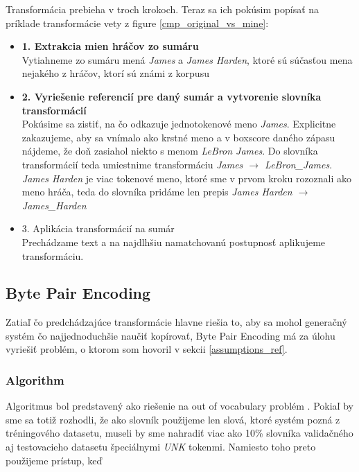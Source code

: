 Transformácia prebieha v troch krokoch. Teraz sa ich pokúsim popísať na príklade transformácie vety z figure \ref{cmp_original_vs_mine}:
\begin{itemize}
    \item \textbf{1. Extrakcia mien hráčov zo sumáru} \hfill \\
    Vytiahneme zo sumáru mená \emph{James} a \emph{James Harden}, ktoré sú súčasťou mena nejakého z hráčov, ktorí sú známi z korpusu
    \item \textbf{2. Vyriešenie referencií pre daný sumár a vytvorenie slovníka transformácií} \hfill \\
    Pokúsime sa zistiť, na čo odkazuje jednotokenové meno \emph{James}. Explicitne zakazujeme, aby sa vnímalo ako krstné meno a v boxscore daného zápasu nájdeme, že doň zasiahol niekto s menom \emph{LeBron James}. Do slovníka transformácií teda umiestnime transformáciu \emph{James $\rightarrow$ LeBron\_James}. \emph{James Harden} je viac tokenové meno, ktoré sme v prvom kroku rozoznali ako meno hráča, teda do slovníka pridáme len prepis \emph{James Harden $\rightarrow$ James\_Harden}
    \item 3. Aplikácia transformácií na sumár \hfill \\
    Prechádzame text a na najdlhšiu namatchovanú postupnosť aplikujeme transformáciu.
\end{itemize}

\subsection{Byte Pair Encoding} \label{bpeSection}

Zatiaľ čo predchádzajúce transformácie hlavne riešia to, aby sa mohol generačný systém čo najjednoduchšie naučiť kopírovať, Byte Pair Encoding má za úlohu vyriešiť problém, o ktorom som hovoril v sekcii \ref{assumptions_ref}.

\subsubsection{Algorithm}

Algoritmus bol predstavený ako riešenie na out of vocabulary problém \citep{sennrich2016}. Pokiaľ by sme sa totiž rozhodli, že ako slovník použijeme len slová, ktoré systém pozná z tréningového datasetu, museli by sme nahradiť viac ako 10\% slovníka validačného aj testovacieho datasetu špeciálnymi \emph{UNK} tokenmi. Namiesto toho preto použijeme prístup, keď 